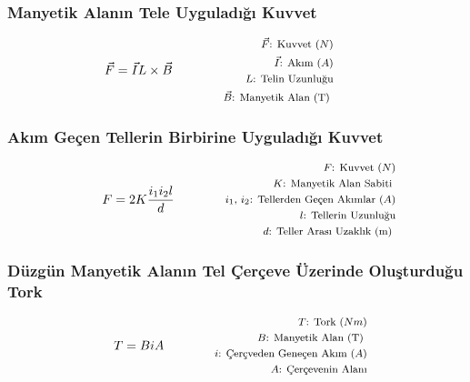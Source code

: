 \subsubsection*{Manyetik Alanın Tele Uyguladığı Kuvvet}
\begin{equation}
    \vec{F} = \vec{I}L \times \vec{B} \qquad \qquad \parbox{4cm}{\footnotesize$\begin{aligned}
        \vec{F}\text{: Kuvvet } (N) \\
        \vec{I}\text{: Akım } (A) \\
        L\text{: Telin Uzunluğu} \\
        \vec{B}\text{: Manyetik Alan (T) }
\end{aligned}$}
\end{equation}

\subsubsection*{Akım Geçen Tellerin Birbirine Uyguladığı Kuvvet}
\begin{equation}
    F = 2K \frac{i_1 i_2 l}{d} \qquad \qquad \parbox{4cm}{\footnotesize$\begin{aligned}
        F\text{: Kuvvet } (N) \\
        K\text{: Manyetik Alan Sabiti } \\
        i_1\text{, }i_2\text{: Tellerden Geçen Akımlar } (A) \\
        l\text{: Tellerin Uzunluğu} \\
        d\text{: Teller Arası Uzaklık (m) }
\end{aligned}$}
\end{equation}

\subsubsection*{Düzgün Manyetik Alanın Tel Çerçeve Üzerinde Oluşturduğu Tork}
\begin{equation}
    T = B i A \qquad \qquad \parbox{4cm}{\footnotesize$\begin{aligned}
        T\text{: Tork } (Nm) \\
        B\text{: Manyetik Alan (T) } \\
        i\text{: Çerçveden Geneçen Akım } (A) \\
        A\text{: Çerçevenin Alanı} \\
\end{aligned}$}
\end{equation}

